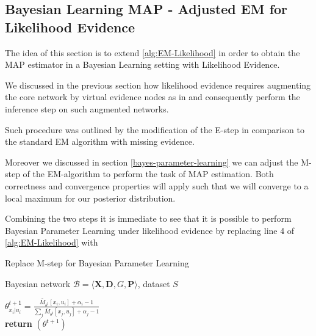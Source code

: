 \documentclass[11pt]{article}
\begin{document}
\begin{article}
\newpage

\subsection{Bayesian Learning MAP - Adjusted EM for Likelihood Evidence}
\label{sec:org85c06fb}

The idea of this section is to extend \ref{alg:EM-Likelihood} in
order to obtain the MAP estimator in a Bayesian Learning setting
with Likelihood Evidence.

We discussed in the previous section how likelihood evidence
requires augmenting the core network by virtual evidence nodes as
in \cite{pearl2014probabilistic} and consequently perform the
inference step on such augmented networks.

Such procedure was outlined by the modification of the E-step in
comparison to the standard EM algorithm with missing evidence.

Moreover we discussed in section \ref{bayes-parameter-learning} we
can adjust the M-step of the EM-algorithm to perform the task of
MAP estimation. Both correctness and convergence properties will
apply such that we will converge to a local maximum for our
posterior distribution.

Combining the two steps it is immediate to see that it is possible
to perform Bayesian Parameter Learning under likelihood evidence
by replacing line 4 of \ref{alg:EM-Likelihood} with 

\begin{algorithm*}[h!]
\caption{Replace M-step for Bayesian Parameter Learning}
\label{alg:Bayes-EM-Likelihood}
\vspace{-10pt}
\begin{multicols}{2}
\begin{algorithmic}[1] 
\Require Bayesian network $\mathcal{B}=\langle \mathbf{X},\mathbf{D}, G, \mathbf{P} \rangle$, dataset $S$ 

   \State $\theta_{x_{i}|u_{i}}^{t+1}=\frac{\bar{M}_{\theta^{t}}[x_{i},u_{i}] + \alpha_i - 1}{\sum_j \bar{M}_{\theta^{t}}[x_{j},u_{j}] + \alpha_j - 1}$\\
   
   \textbf{return} $(\theta^{t+1})$

\end{algorithmic}
\end{multicols}
\end{algorithm*}


\end{article}
\end{document}
